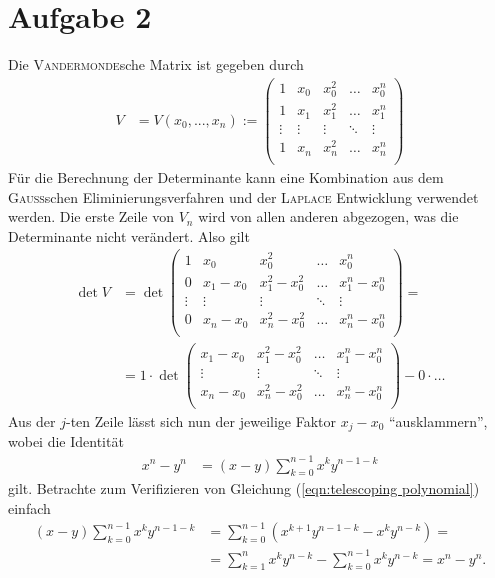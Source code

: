 \documentclass[english, parskip=full]{scrartcl}
\newcommand{\kla}{}
\begin{document}
\section*{Aufgabe 2}
Die \textsc{Vandermonde}sche Matrix ist gegeben durch
\begin{align}
V&=V(x_0,...,x_n):=\begin{pmatrix}
1&x_0&x_0^2&\dots&x_0^n \\ 
1&x_1&x_1^2&\dots&x_1^n \\ 
\vdots&\vdots&\vdots &\ddots&\vdots\\
1&x_n&x_n^2&\dots&x_n^n \\ 
\end{pmatrix}
\end{align}
Für die Berechnung der Determinante kann eine Kombination aus dem \textsc{Gauss}schen Eliminierungsverfahren und der \textsc{Laplace} Entwicklung verwendet werden. 
Die erste Zeile von $V_n$ wird von allen anderen abgezogen, was die Determinante nicht verändert.
Also gilt
\begin{align}
\det V&=\det\begin{pmatrix}
1&x_0&x_0^2&\dots&x_0^n \\ 
0&x_1-x_0&x_1^2-x_0^2&\dots&x_1^n-x_0^n\\
\vdots&\vdots&\vdots &\ddots&\vdots\\
0&x_n-x_0&x_n^2-x_0^2&\dots&x_n^n-x_0^n\\
\end{pmatrix}=\\
&=1\cdot\det\begin{pmatrix}
x_1-x_0&x_1^2-x_0^2&\dots&x_1^n-x_0^n\\
\vdots&\vdots &\ddots&\vdots\\
x_n-x_0&x_n^2-x_0^2&\dots&x_n^n-x_0^n\\
\end{pmatrix}-0\cdot\dots
\end{align}
Aus der $j$-ten Zeile lässt sich nun der jeweilige Faktor $x_j-x_0$ ``ausklammern'', wobei die Identität 
\begin{align}
x^n-y^n&=(x-y)\sum_{k=0}^{n-1}x^ky^{n-1-k}\label{eqn:telescoping polynomial}
\end{align}
gilt. 
Betrachte zum Verifizieren von Gleichung (\ref{eqn:telescoping polynomial}) einfach
\begin{align}
(x-y)\sum_{k=0}^{n-1}x^ky^{n-1-k}&=\sum_{k=0}^{n-1}\kla\left( x^{k+1}y^{n-1-k}-x^ky^{n-k} \right)=\\
&=\sum_{k=1}^{n}x^{k}y^{n-k}-\sum_{k=0}^{n-1}x^ky^{n-k}=x^n-y^n.
\end{align} 
\end{document}
